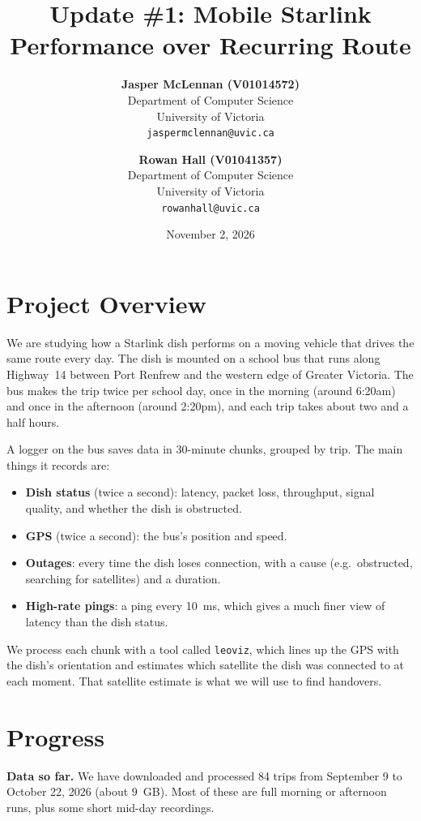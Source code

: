 \documentclass{article}
\title{\textbf{Update \#1: Mobile Starlink Performance over Recurring Route}}
\author{
    \textbf{Jasper McLennan (V01014572)} \\
    \small Department of Computer Science \\
    \small University of Victoria \\
    \small \texttt{jaspermclennan@uvic.ca}
    \and
    \textbf{Rowan Hall (V01041357)} \\
    \small Department of Computer Science \\
    \small University of Victoria \\
    \small \texttt{rowanhall@uvic.ca}
}
\date{\small November 2, 2026}
\begin{document}
\maketitle

\section{Project Overview}

We are studying how a Starlink dish performs on a moving vehicle that drives the same route every day. The dish is mounted on a school bus that runs along Highway~14 between Port Renfrew and the western edge of Greater Victoria. The bus makes the trip twice per school day, once in the morning (around 6:20am) and once in the afternoon (around 2:20pm), and each trip takes about two and a half hours.

A logger on the bus saves data in 30-minute chunks, grouped by trip. The main things it records are:
\begin{itemize}
    \item \textbf{Dish status} (twice a second): latency, packet loss, throughput, signal quality, and whether the dish is obstructed.
    \item \textbf{GPS} (twice a second): the bus's position and speed.
    \item \textbf{Outages}: every time the dish loses connection, with a cause (e.g.\ obstructed, searching for satellites) and a duration.
    \item \textbf{High-rate pings}: a ping every 10~ms, which gives a much finer view of latency than the dish status.
\end{itemize}

We process each chunk with a tool called \texttt{leoviz}, which lines up the GPS with the dish's orientation and estimates which satellite the dish was connected to at each moment. That satellite estimate is what we will use to find handovers.

\section{Progress}

\textbf{Data so far.} We have downloaded and processed 84 trips from September 9 to October 22, 2026 (about 9~GB). Most of these are full morning or afternoon runs, plus some short mid-day recordings.
\end{document}
